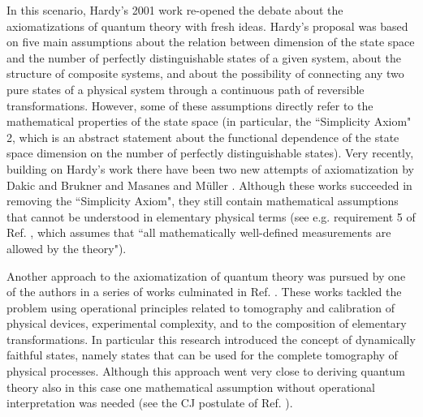 \documentclass[12pt,aps,pra,showpacs,groupedaddress]{revtex4-1}
\begin{document}
In this scenario, Hardy's 2001 work \cite{Har01} re-opened the debate about the axiomatizations of
quantum theory with fresh ideas. Hardy's proposal was based on five main assumptions about the relation between
dimension of the state space and the number of perfectly distinguishable states of a given system, about 
the structure of composite systems, and about the possibility of connecting any two pure states of a
physical system through a continuous path of reversible transformations.  However, some of these assumptions
directly refer to the mathematical properties of the state space (in particular, the ``Simplicity Axiom" 2, which is an abstract statement about the functional dependence of the state space dimension on the number of perfectly distinguishable states).    Very recently, building on Hardy's work
there have been two new attempts of axiomatization by Dakic and Brukner \cite{DakBru09} and Masanes
and M\"uller \cite{Mas10}. Although these works succeeded in removing the ``Simplicity Axiom", they
still contain mathematical assumptions that cannot be understood in elementary physical terms (see e.g.
requirement 5 of Ref. \cite{Mas10}, which assumes that ``all mathematically well-defined
measurements are allowed by the theory").

Another approach to the axiomatization of quantum theory was pursued by one of the authors in a
series of works \cite{maurofirst} culminated in Ref. \cite{maurolast}.  These works tackled the
problem using operational principles related to tomography and calibration of physical devices,
experimental complexity, and to the composition of elementary transformations.  In particular this
research introduced the concept of dynamically faithful states, namely states that can be used for
the complete tomography of physical processes.  Although this approach went very close to deriving
quantum theory also in this case one mathematical assumption without operational interpretation was needed (see the CJ postulate of
Ref. \cite{maurolast}).
\end{document}
